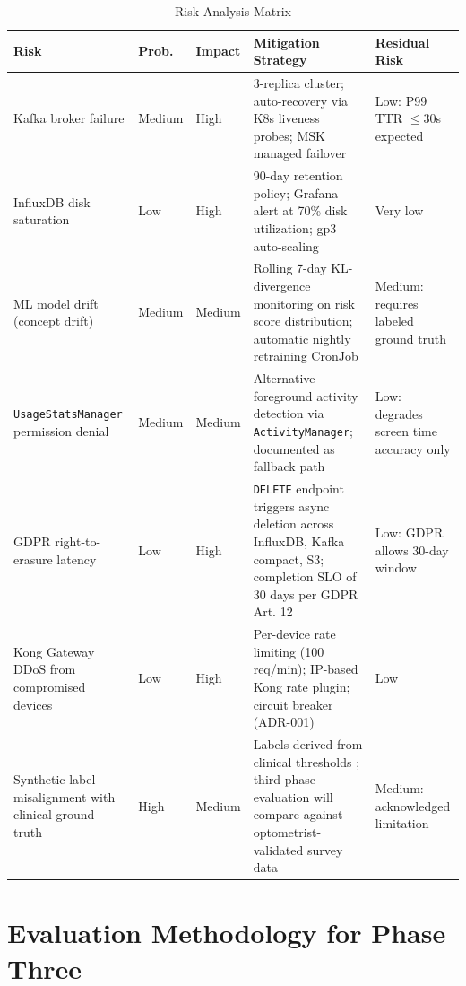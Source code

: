 \documentclass[conference]{IEEEtran}
\begin{document}
\begin{table}[H]
  \centering
  \caption{Risk Analysis Matrix}
  \label{tab:risks}
  \begin{tabularx}{\textwidth}{p{3.5cm} p{1.3cm} p{1.3cm} p{4cm} X}
    \toprule
    \textbf{Risk} & \textbf{Prob.} & \textbf{Impact} & \textbf{Mitigation Strategy} &
    \textbf{Residual Risk} \\
    \midrule
    Kafka broker failure & Medium & High &
      3-replica cluster; auto-recovery via K8s liveness probes; MSK managed failover &
      Low: P99 TTR $\leq$30s expected \\
    \addlinespace
    InfluxDB disk saturation & Low & High &
      90-day retention policy; Grafana alert at 70\% disk utilization; gp3 auto-scaling &
      Very low \\
    \addlinespace
    ML model drift (concept drift) & Medium & Medium &
      Rolling 7-day KL-divergence monitoring on risk score distribution; automatic
      nightly retraining CronJob &
      Medium: requires labeled ground truth \\
    \addlinespace
    \texttt{UsageStatsManager} permission denial & Medium & Medium &
      Alternative foreground activity detection via \texttt{ActivityManager};
      documented as fallback path &
      Low: degrades screen time accuracy only \\
    \addlinespace
    GDPR right-to-erasure latency & Low & High &
      \texttt{DELETE} endpoint triggers async deletion across InfluxDB, Kafka compact,
      S3; completion SLO of 30 days per GDPR Art. 12 &
      Low: GDPR allows 30-day window \\
    \addlinespace
    Kong Gateway DDoS from compromised devices & Low & High &
      Per-device rate limiting (100 req/min); IP-based Kong rate plugin; circuit breaker
      (ADR-001) &
      Low \\
    \addlinespace
    Synthetic label misalignment with clinical ground truth & High & Medium &
      Labels derived from clinical thresholds \cite{b2}; third-phase evaluation will
      compare against optometrist-validated survey data &
      Medium: acknowledged limitation \\
    \bottomrule
  \end{tabularx}
\end{table}

\section{Evaluation Methodology for Phase Three}
\end{document}

